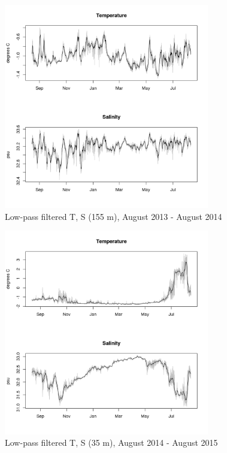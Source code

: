 \documentclass[12pt]{dforeport}
\begin{document}
\begin{figure}  
\centering
\includegraphics[width = 0.8\textwidth]{./figures/27_lpf_TS_155m_2013_2014.png}
\caption[Low-pass filtered T, S (155 m), 2013-2014]{Low-pass filtered T, S (155 m), August 2013 - August 2014}
\label{f:ctd_155_lpf_2013_2014}
\end{figure}


\begin{figure}  
\centering
\includegraphics[width = 0.8\textwidth]{./figures/28_lpf_TS_35m_2014_2015.png}
\caption[Low-pass filtered T, S (35 m), 2014-2015]{Low-pass filtered T, S (35 m), August 2014 - August 2015}
\label{f:ctd_35_lpf_2014_2015}
\end{figure}
\end{document}
